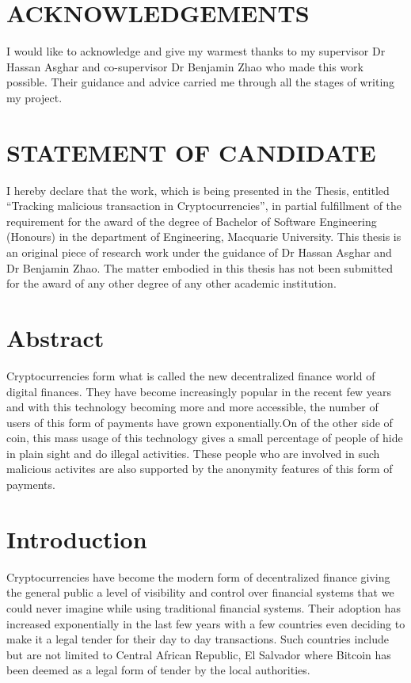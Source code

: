 \documentclass{article}
\begin{document}
\begin{center}
    \section*{ACKNOWLEDGEMENTS}
        I would like to acknowledge and give my warmest thanks to my supervisor Dr Hassan Asghar and co-supervisor Dr Benjamin Zhao who made this work possible. Their guidance and advice carried me through all the stages of writing my project. 
        \pagebreak
    \section*{STATEMENT OF CANDIDATE}
        I hereby declare that the work, which is being presented in the Thesis, entitled “Tracking malicious transaction in Cryptocurrencies”, in partial fulfillment of the requirement for the award of the degree of Bachelor of Software Engineering (Honours) in the department of Engineering, Macquarie University.  This thesis is an original piece of research work under the guidance of Dr Hassan Asghar and Dr Benjamin Zhao. The matter embodied in this thesis has not been submitted for the award of any other degree of any other academic institution.
        \pagebreak

\tableofcontents
\pagebreak
\listoffigures
\pagebreak
\lstlistoflistings
\pagebreak

\section*{Abstract}
    Cryptocurrencies form what is called the new decentralized finance world of digital finances. They have become increasingly popular in the recent few years and with this technology becoming more and more accessible, the number of users of this form of payments have grown exponentially.On of the other side of coin, this mass usage of this technology gives a small percentage of people of hide in plain sight and do illegal activities. These people who are involved in such malicious activites are also supported by the anonymity features of this form of payments. 

\end{center}

\pagebreak

\section{Introduction}
    Cryptocurrencies have become the modern form of decentralized finance giving the general public a level of visibility and control over financial systems that we could never imagine while using traditional financial systems. Their adoption has increased exponentially in the last few years with a few countries even deciding to make it a legal tender for their day to day transactions. Such countries include but are not limited to Central African Republic, El Salvador \cite{browne_2022} where Bitcoin has been deemed as a legal form of tender by the local authorities. 
\end{document}
